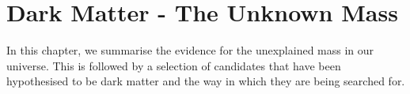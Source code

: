 \chapter{Dark Matter - The Unknown Mass}
\label{chap:dark_matter_evidence}

\par
In this chapter, we summarise the evidence for the unexplained mass in our universe.
This is followed by a selection of candidates that have been hypothesised to be dark matter and the way in which they are being searched for.




